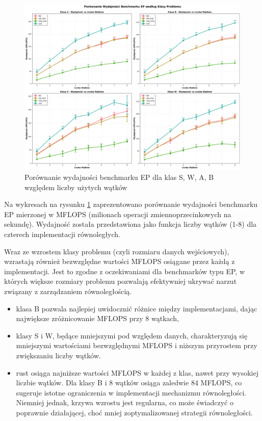 \begin{figure}[H]
    \centering
    \includegraphics[width=\textwidth]{analiza/images/parallel/ep/ep_porownanie_wydajnosci.png}
    \caption{Porównanie wydajności benchmarku EP dla klas S, W, A, B względem liczby użytych wątków}
    \label{ep_porownanie_wydajnosci}
\end{figure}
Na wykresach na rysunku \ref{ep_porownanie_wydajnosci} zaprezentowano porównanie wydajności benchmarku EP mierzonej w MFLOPS (milionach operacji zmiennoprzecinkowych na sekundę). Wydajność została przedstawiona jako funkcja liczby wątków (1-8) dla czterech implementacji równoległych.

Wraz ze wzrostem klasy problemu (czyli rozmiaru danych wejściowych), wzrastają również bezwzględne wartości MFLOPS osiągane przez każdą z implementacji. Jest to zgodne z oczekiwaniami dla benchmarków typu EP, w których większe rozmiary problemu pozwalają efektywniej ukrywać narzut związany z zarządzaniem równoległością.
\begin{itemize}
    \item klasa B pozwala najlepiej uwidocznić różnice między implementacjami, dając największe zróżnicowanie MFLOPS przy 8 wątkach,
    \item klasy S i W, będące mniejszymi pod względem danych, charakteryzują się mniejszymi wartościami bezwzględnymi MFLOPS i niższym przyrostem przy zwiększaniu liczby wątków.
    \item rust osiąga najniższe wartości MFLOPS w każdej z klas, nawet przy wysokiej liczbie wątków. Dla klasy B i 8 wątków osiąga zaledwie 84 MFLOPS, co sugeruje istotne ograniczenia w implementacji mechanizmu równoległości. Niemniej jednak, krzywa wzrostu jest regularna, co może świadczyć o poprawnie działającej, choć mniej zoptymalizowanej strategii równoległości.
\end{itemize}





